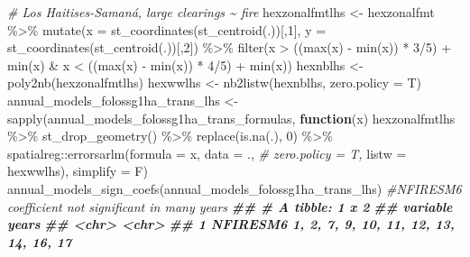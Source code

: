 \documentclass[10pt,landscape,a3paper]{article}
\newenvironment{Shaded}{\begin{snugshade}}{\end{snugshade}}
\newcommand{\AttributeTok}[1]{\textcolor[rgb]{0.77,0.63,0.00}{#1}}
\newcommand{\CommentTok}[1]{\textcolor[rgb]{0.56,0.35,0.01}{\textit{#1}}}
\newcommand{\ControlFlowTok}[1]{\textcolor[rgb]{0.13,0.29,0.53}{\textbf{#1}}}
\newcommand{\DecValTok}[1]{\textcolor[rgb]{0.00,0.00,0.81}{#1}}
\newcommand{\DocumentationTok}[1]{\textcolor[rgb]{0.56,0.35,0.01}{\textbf{\textit{#1}}}}
\newcommand{\FunctionTok}[1]{\textcolor[rgb]{0.00,0.00,0.00}{#1}}
\newcommand{\NormalTok}[1]{#1}
\newcommand{\OtherTok}[1]{\textcolor[rgb]{0.56,0.35,0.01}{#1}}
\newcommand{\SpecialCharTok}[1]{\textcolor[rgb]{0.00,0.00,0.00}{#1}}
\begin{document}
\begin{Shaded}
\begin{Highlighting}[]
\CommentTok{\# Los Haitises{-}Samaná, large clearings \textasciitilde{} fire}
\NormalTok{hexzonalfmtlhs }\OtherTok{\textless{}{-}}\NormalTok{ hexzonalfmt }\SpecialCharTok{\%\textgreater{}\%}
  \FunctionTok{mutate}\NormalTok{(}\AttributeTok{x =} \FunctionTok{st\_coordinates}\NormalTok{(}\FunctionTok{st\_centroid}\NormalTok{(.))[,}\DecValTok{1}\NormalTok{], }\AttributeTok{y =} \FunctionTok{st\_coordinates}\NormalTok{(}\FunctionTok{st\_centroid}\NormalTok{(.))[,}\DecValTok{2}\NormalTok{]) }\SpecialCharTok{\%\textgreater{}\%}
  \FunctionTok{filter}\NormalTok{(x }\SpecialCharTok{\textgreater{}}\NormalTok{ ((}\FunctionTok{max}\NormalTok{(x) }\SpecialCharTok{{-}} \FunctionTok{min}\NormalTok{(x)) }\SpecialCharTok{*} \DecValTok{3}\SpecialCharTok{/}\DecValTok{5}\NormalTok{) }\SpecialCharTok{+} \FunctionTok{min}\NormalTok{(x) }\SpecialCharTok{\&}\NormalTok{ x }\SpecialCharTok{\textless{}}\NormalTok{ ((}\FunctionTok{max}\NormalTok{(x) }\SpecialCharTok{{-}} \FunctionTok{min}\NormalTok{(x)) }\SpecialCharTok{*} \DecValTok{4}\SpecialCharTok{/}\DecValTok{5}\NormalTok{) }\SpecialCharTok{+} \FunctionTok{min}\NormalTok{(x))}
\NormalTok{hexnblhs }\OtherTok{\textless{}{-}} \FunctionTok{poly2nb}\NormalTok{(hexzonalfmtlhs)}
\NormalTok{hexwwlhs }\OtherTok{\textless{}{-}} \FunctionTok{nb2listw}\NormalTok{(hexnblhs, }\AttributeTok{zero.policy =}\NormalTok{ T)}
\NormalTok{annual\_models\_folossg1ha\_trans\_lhs }\OtherTok{\textless{}{-}} \FunctionTok{sapply}\NormalTok{(annual\_models\_folossg1ha\_trans\_formulas,}
                        \ControlFlowTok{function}\NormalTok{(x)}
\NormalTok{                          hexzonalfmtlhs }\SpecialCharTok{\%\textgreater{}\%}
                          \FunctionTok{st\_drop\_geometry}\NormalTok{() }\SpecialCharTok{\%\textgreater{}\%}
                          \FunctionTok{replace}\NormalTok{(}\FunctionTok{is.na}\NormalTok{(.), }\DecValTok{0}\NormalTok{) }\SpecialCharTok{\%\textgreater{}\%}
\NormalTok{                          spatialreg}\SpecialCharTok{::}\FunctionTok{errorsarlm}\NormalTok{(}\AttributeTok{formula =}\NormalTok{ x,}
                                                 \AttributeTok{data =}\NormalTok{ ., }\CommentTok{\# zero.policy = T,}
                                                 \AttributeTok{listw =}\NormalTok{ hexwwlhs),}
                        \AttributeTok{simplify =}\NormalTok{ F)}
\FunctionTok{annual\_models\_sign\_coefs}\NormalTok{(annual\_models\_folossg1ha\_trans\_lhs) }\CommentTok{\#NFIRESM6 coefficient not significant in many years}
\DocumentationTok{\#\# \# A tibble: 1 x 2}
\DocumentationTok{\#\#   variable years                                 }
\DocumentationTok{\#\#   \textless{}chr\textgreater{}    \textless{}chr\textgreater{}                                 }
\DocumentationTok{\#\# 1 NFIRESM6 1, 2, 7, 9, 10, 11, 12, 13, 14, 16, 17}


\end{Highlighting}
\end{Shaded}
\end{document}
